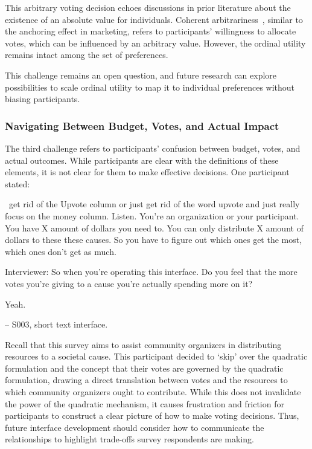 This arbitrary voting decision echoes discussions in prior literature about the existence of an absolute value for individuals. Coherent arbitrariness~\cite{arielyCoherentArbitrarinessStable2003}, similar to the anchoring effect in marketing, refers to participants' willingness to allocate votes, which can be influenced by an arbitrary value. However, the ordinal utility remains intact among the set of preferences.

This challenge remains an open question, and future research can explore possibilities to scale ordinal utility to map it to individual preferences without biasing participants.

\subsubsection{Navigating Between Budget, Votes, and Actual Impact}
The third challenge refers to participants' confusion between budget, votes, and actual outcomes. While participants are clear with the definitions of these elements, it is not clear for them to make effective decisions. One participant stated:

\begin{displayquote}

~\bracketellipsis get rid of the Upvote column or just get rid of the word upvote and just really focus on the money column. Listen. You're an organization or your participant. You have X amount of dollars you need to. You can only distribute X amount of dollars to these these causes. So you have to figure out which ones get the most, which ones don't get as much.~\bracketellipsis 

Interviewer: So when you're operating this interface. Do you feel that the more votes you're giving to a cause you're actually spending more on it?

Yeah.
       
\noindent \hfill -- S003, short text interface.
\end{displayquote}
Recall that this survey aims to assist community organizers in distributing resources to a societal cause. This participant decided to `skip' over the quadratic formulation and the concept that their votes are governed by the quadratic formulation, drawing a direct translation between votes and the resources to which community organizers ought to contribute. While this does not invalidate the power of the quadratic mechanism, it causes frustration and friction for participants to construct a clear picture of how to make voting decisions. Thus, future interface development should consider how to communicate the relationships to highlight trade-offs survey respondents are making.

